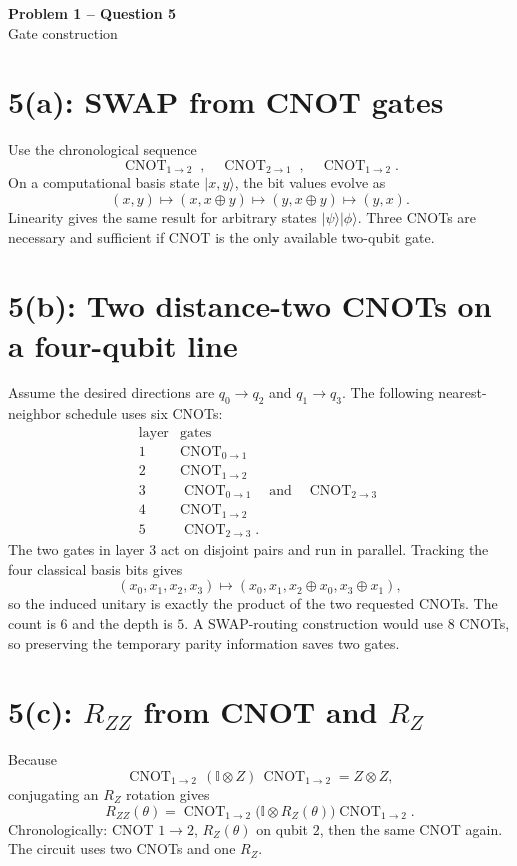 \documentclass[11pt]{article}
\newcommand{\ket}[1]{\lvert #1\rangle}
\newcommand{\I}{\mathbb{I}}
\newcommand{\CNOT}[2]{\operatorname{CNOT}_{#1\to #2}}
\begin{document}
\begin{center}
  {\Large\bfseries Problem 1 -- Question 5}\\[0.3em]
  {\large Gate construction}
\end{center}

\section*{5(a): SWAP from CNOT gates}

Use the chronological sequence
\[
 \boxed{\CNOT{1}{2}\;,\quad\CNOT{2}{1}\;,\quad\CNOT{1}{2}.}
\]
On a computational basis state \(\ket{x,y}\), the bit values evolve as
\[
 (x,y)\mapsto(x,x\oplus y)
 \mapsto(y,x\oplus y)\mapsto(y,x).
\]
Linearity gives the same result for arbitrary states
\(\ket\psi\ket\phi\). Three CNOTs are necessary and sufficient if CNOT
is the only available two-qubit gate.

\section*{5(b): Two distance-two CNOTs on a four-qubit line}

Assume the desired directions are \(q_0\to q_2\) and \(q_1\to q_3\).
The following nearest-neighbor schedule uses six CNOTs:
\[
\begin{array}{c|l}
\text{layer}&\text{gates}\\ \hline
1&\CNOT{0}{1}\\
2&\CNOT{1}{2}\\
3&\CNOT{0}{1}\quad\text{and}\quad\CNOT{2}{3}\\
4&\CNOT{1}{2}\\
5&\CNOT{2}{3}.
\end{array}
\]
The two gates in layer \(3\) act on disjoint pairs and run in parallel.
Tracking the four classical basis bits gives
\[
 (x_0,x_1,x_2,x_3)
 \longmapsto
 (x_0,x_1,x_2\oplus x_0,x_3\oplus x_1),
\]
so the induced unitary is exactly the product of the two requested
CNOTs. The count is \(6\) and the depth is \(5\). A SWAP-routing
construction would use \(8\) CNOTs, so preserving the temporary parity
information saves two gates.

\section*{5(c): \(R_{ZZ}\) from CNOT and \(R_Z\)}

Because
\[
 \CNOT{1}{2}\,(\I\otimes Z)\,\CNOT{1}{2}=Z\otimes Z,
\]
conjugating an \(R_Z\) rotation gives
\[
\boxed{
 R_{ZZ}(\theta)
 =\CNOT{1}{2}
   \bigl(\I\otimes R_Z(\theta)\bigr)
   \CNOT{1}{2}.
}
\]
Chronologically: CNOT \(1\to2\), \(R_Z(\theta)\) on qubit \(2\), then
the same CNOT again. The circuit uses two CNOTs and one \(R_Z\).
\end{document}
